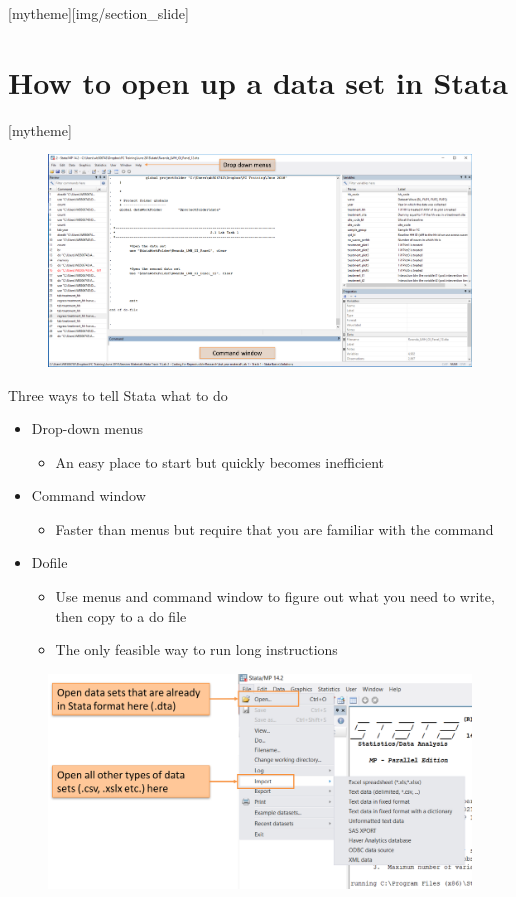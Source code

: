 \documentclass[aspectratio=169]{beamer}
\newcommand{\sectionpic}[2]{
	\setbeamertemplate{section page}[mytheme][#2]
	\section{#1}
	\setbeamertemplate{section page}[mytheme]
}
\begin{document}
\sectionpic{How to open up a data set in Stata}{img/section_slide}

\begin{frame}{}
	\begin{figure}
	\centering
	\includegraphics[width=\linewidth]{img/open_dataset}
\end{figure}
\end{frame}

\begin{frame}{Three ways to tell Stata what to do}
\begin{itemize}
	\item Drop-down menus
		\begin{itemize}
			\item An easy place to start but quickly becomes inefficient
		\end{itemize}
	\item Command window
		\begin{itemize}
			\item Faster than menus but require that you are familiar with the command
		\end{itemize}
	\item Do\-file
		\begin{itemize}
			\item Use menus and command window to figure out what you need to write, then copy to a do file
			\item The only feasible way to run long instructions
		\end{itemize}
\end{itemize}
\end{frame}

\begin{frame}{}
\begin{figure}
	\centering
	\includegraphics[width=\linewidth]{img/open_dataset_menu}
\end{figure}
\end{frame}
\end{document}
